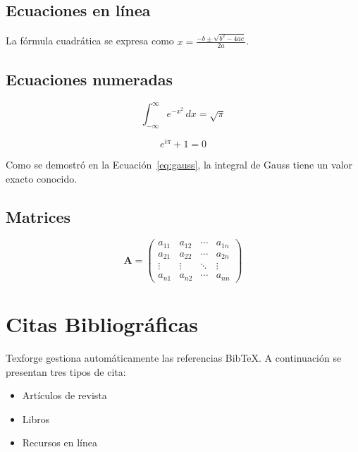 \documentclass[a4paper,12pt]{article}
\begin{document}
  \subsection{Ecuaciones en línea}

  La fórmula cuadrática se expresa como $x = \frac{-b \pm \sqrt{b^2 - 4ac}}{2a}$.

  \subsection{Ecuaciones numeradas}

  \begin{equation}\label{eq:gauss}
    \int_{-\infty}^{\infty} e^{-x^2}\,dx = \sqrt{\pi}
  \end{equation}

  \begin{equation}\label{eq:euler}
    e^{i\pi} + 1 = 0
  \end{equation}

  Como se demostró en la Ecuación~\ref{eq:gauss}, la integral de Gauss
  tiene un valor exacto conocido.

  \subsection{Matrices}

  \begin{equation}\label{eq:matriz}
    \mathbf{A} = \begin{pmatrix}
      a_{11} & a_{12} & \cdots & a_{1n} \\
      a_{21} & a_{22} & \cdots & a_{2n} \\
      \vdots & \vdots & \ddots & \vdots \\
      a_{n1} & a_{n2} & \cdots & a_{nn}
    \end{pmatrix}
  \end{equation}

  \section{Citas Bibliográficas}\label{sec:bib}

  Texforge gestiona automáticamente las referencias BibTeX. A continuación
  se presentan tres tipos de cita:

  \begin{itemize}
    \item Artículos de revista~\cite{example}
    \item Libros~\cite{example2}
    \item Recursos en línea~\cite{example3}
  \end{itemize}
\end{document}
